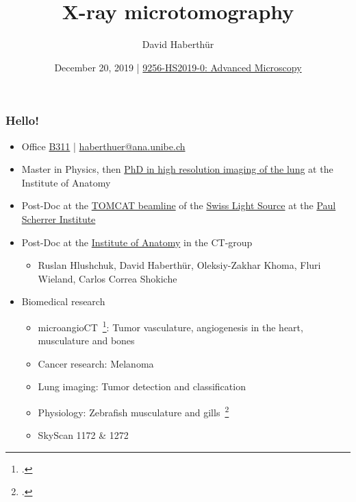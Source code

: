 \documentclass[aspectratio=169,10pt,draft]{beamer}
\title{X-ray microtomography}
\author{David Haberthür}
\institute{Institute of Anatomy\\University of Bern\\Switzerland}
\date{December 20, 2019 | \href{https://ilias.unibe.ch/ilias.php?ref_id=1555744&cmd=infoScreen&cmdClass=ilrepositorygui&cmdNode=y2&baseClass=ilrepositorygui}{9256-HS2019-0: Advanced Microscopy}}
\newcommand{\uct}{\si{\micro}CT\xspace} %
\begin{document}
{%
	\begin{frame}%
		\maketitle
	\end{frame}%
}


\begin{frame}
	\frametitle{Hello!}
	\begin{itemize}
		\item Office \href{http://osm.org/go/0CZwlGp3A?m}{B311} | \href{mailto:haberthuer@ana.unibe.ch?subject=Feedback\%20from\%20the\%20(micro)-tomography\%20lecture}{haberthuer@ana.unibe.ch}
		\item Master in Physics, then \href{https://boris.unibe.ch/2619/}{PhD in high resolution imaging of  the lung} at the Institute of Anatomy
		\item Post-Doc at the \href{https://www.psi.ch/sls/tomcat/}{TOMCAT beamline} of the \href{https://www.psi.ch/sls/}{Swiss Light Source} at the \href{https://www.psi.ch/}{Paul Scherrer Institute}
		\item Post-Doc at the \href{https://aan.unibe.ch}{Institute of Anatomy} in the \uct-group
		\begin{itemize}
			\item Ruslan Hlushchuk, David Haberthür, Oleksiy-Zakhar Khoma, Fluri Wieland, Carlos Correa Shokiche
		\end{itemize}			
		\item Biomedical research
		\begin{itemize}
			\item microangioCT~\footcite{Hlushchuk2018}: Tumor vasculature, angiogenesis in the heart, musculature and bones
			\item Cancer research: Melanoma
			\item Lung imaging: Tumor detection and classification
			\item Physiology: Zebrafish musculature and gills~\footcite{Messerli2019}
			\item SkyScan 1172 \& 1272
		\end{itemize}
	\end{itemize}		
\end{frame}
\end{document}
